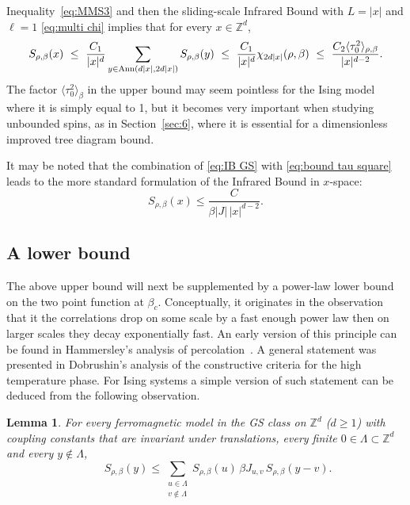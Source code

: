 \documentclass[a4paper,oneside,11pt]{article}
\def\Z{\mathbb{Z}}                          %
\newtheorem{lemma}[theorem]{Lemma}
\newcommand{\be}[1]{\begin{equation}\label{#1}}
\newcommand{\ee}{\end{equation}}
\numberwithin{equation}{section}
\numberwithin{equation}{section}
\numberwithin{equation}{section}
\def\Z{\mathbb{Z}}                          %
\def\be{\begin{equation}}
\def\ee{\end{equation}}
\begin{document}
Inequality~\eqref{eq:MMS3}  and then the sliding-scale Infrared Bound with $L=|x|$ and $\ell=1$ \eqref{eq:multi chi} implies that for every $x\in\Z^d$,
\begin{equation}\label{eq:IB GS}
S_{\rho,\beta}(x)\ \le \  \frac{C_1}{|x|^{d}}\sum_{y\in {\rm Ann}(d|x|,2d|x|)}S_{\rho,\beta}(y)\ \le\  \frac{C_1}{|x|^{d}}\chi_{2d|x|}(\rho,\beta)\ \le\   \frac{C_2\langle\tau_0^2\rangle_{\rho,\beta} }{|x|^{d-2}}.
\end{equation}
The factor $\langle\tau_0^2\rangle_\beta$ in the upper bound may seem pointless for the Ising model where it is simply equal to 1, but it  becomes very important when studying unbounded spins, as  in Section~\ref{sec:6}, where it is essential for a dimensionless improved tree diagram bound.

It may be noted that the combination of   \eqref{eq:IB GS} with \eqref{eq:bound tau square}  leads to the more standard formulation \cite{FILS78,FroSimSpe76} of the Infrared Bound in $x$-space:
\be \label{eq:IB} 
S_{\rho,\beta}(x) \le
\frac{C}{\beta |J|\,|x|^{d-2}}.
\ee   


\subsection{A lower bound} 

The above upper bound will next be supplemented by a  power-law lower bound on the two point function at $\beta_c$.   Conceptually, it originates in the observation that it the correlations  drop on some scale by a fast enough power law then on larger scales they decay exponentially fast.    An  early version of this principle can be found in Hammersley's analysis of percolation~\cite{Ham57}.   A general statement was presented in Dobrushin's analysis of the constructive criteria for the high temperature phase.   For Ising systems a simple version of such  statement can be deduced from the following observation.   


\begin{lemma} \label{lem_SL}
For every ferromagnetic {model in the GS class} on $\Z^d$ ($d\ge1$) with coupling constants that are invariant under translations, every finite $0\in\Lambda \subset \Z^d$ and every $y\notin \Lambda$,
 \be\label{eq:genSL}
\ \qquad S_{\rho,\beta}(y)\le \sum_{\substack{u\in\Lambda\\ v\notin\Lambda}}S_{\rho,\beta}(u)\,\beta J_{u,v}\,S_{\rho,\beta}(y-v).
\ee
\end{lemma} 
\end{document}
